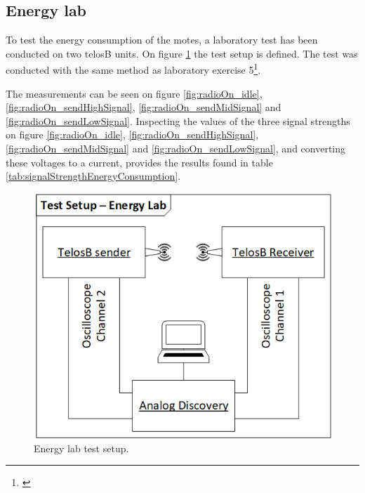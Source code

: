 \subsection{Energy lab}\label{sc:energylab}

To test the energy consumption of the motes, a laboratory test has been conducted on two telosB units. On figure \ref{fig:energyLab_testSetup} the test setup is defined. The test was conducted with the same method as laboratory exercise 5\footnote{\cite{Madsen}}.

\noindent The measurements can be seen on figure \ref{fig:radioOn_idle}, \ref{fig:radioOn_sendHighSignal}, \ref{fig:radioOn_sendMidSignal} and \ref{fig:radioOn_sendLowSignal}. Inspecting the values of the three signal strengths on figure \ref{fig:radioOn_idle}, \ref{fig:radioOn_sendHighSignal}, \ref{fig:radioOn_sendMidSignal} and \ref{fig:radioOn_sendLowSignal}, and converting these voltages to a current, provides the results found in table \ref{tab:signalStrengthEnergyConsumption}.

\begin{figure}[h]
	\centering
	\includegraphics[width=1\linewidth]{implementation/energylab/fig/energyLab_testSetup.png}
	\caption{Energy lab test setup.}
	\label{fig:energyLab_testSetup}
\end{figure}

